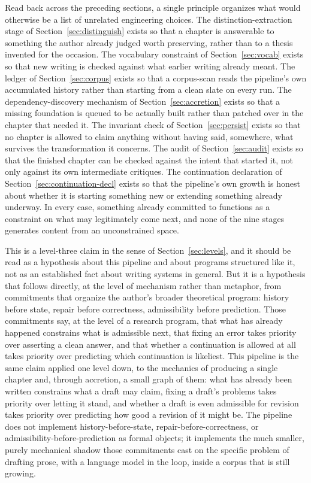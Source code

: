 \documentclass[11pt]{article}
\theoremstyle{definition}
\begin{document}
Read back across the preceding sections, a single principle organizes
what would otherwise be a list of unrelated engineering choices. The
distinction-extraction stage of Section~\ref{sec:distinguish} exists so
that a chapter is answerable to something the author already judged
worth preserving, rather than to a thesis invented for the occasion.
The vocabulary constraint of Section~\ref{sec:vocab} exists so that new
writing is checked against what earlier writing already meant. The
ledger of Section~\ref{sec:corpus} exists so that a corpus-scan reads
the pipeline's own accumulated history rather than starting from a
clean slate on every run. The dependency-discovery mechanism of
Section~\ref{sec:accretion} exists so that a missing foundation is
queued to be actually built rather than patched over in the chapter
that needed it. The invariant check of Section~\ref{sec:persist} exists
so that no chapter is allowed to claim anything without having said,
somewhere, what survives the transformation it concerns. The audit of
Section~\ref{sec:audit} exists so that the finished chapter can be
checked against the intent that started it, not only against its own
intermediate critiques. The continuation declaration of
Section~\ref{sec:continuation-decl} exists so that the pipeline's own
growth is honest about whether it is starting something new or
extending something already underway. In every case, something already
committed to functions as a constraint on what may legitimately come
next, and none of the nine stages generates content from an
unconstrained space.

This is a level-three claim in the sense of Section~\ref{sec:levels},
and it should be read as a hypothesis about this pipeline and about
programs structured like it, not as an established fact about writing
systems in general. But it is a hypothesis that follows directly, at
the level of mechanism rather than metaphor, from commitments that
organize the author's broader theoretical program: history before
state, repair before correctness, admissibility before prediction.
Those commitments say, at the level of a research program, that what
has already happened constrains what is admissible next, that fixing
an error takes priority over asserting a clean answer, and that whether
a continuation is allowed at all takes priority over predicting which
continuation is likeliest. This pipeline is the same claim applied one
level down, to the mechanics of producing a single chapter and, through
accretion, a small graph of them: what has already been written
constrains what a draft may claim, fixing a draft's problems takes
priority over letting it stand, and whether a draft is even admissible
for revision takes priority over predicting how good a revision of it
might be. The pipeline does not implement history-before-state,
repair-before-correctness, or admissibility-before-prediction as formal
objects; it implements the much smaller, purely mechanical shadow those
commitments cast on the specific problem of drafting prose, with a
language model in the loop, inside a corpus that is still growing.
\end{document}
